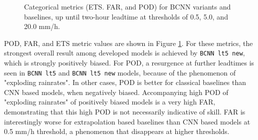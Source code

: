 \begin{figure}[H]
	\caption{Categorical metrics (ETS. FAR, and POD) for BCNN variants and baselines, up until two-hour leadtime at thresholds of 0.5, 5.0, and 20.0 mm/h.}
	\label{fig:cat-metrics}
\end{figure}

POD, FAR, and ETS metric values are shown in Figure \ref{fig:cat-metrics}. For these metrics, the strongest overall result among developed models is achieved by \texttt{BCNN lt5 new}, which is strongly positively biased. 
For POD, a resurgence at further leadtimes is seen in \texttt{BCNN lt5} and \texttt{BCNN lt5 new} models, because of the phenomenon of "exploding rainrates".  In other cases, POD is better for classical baselines than CNN based models, when negatively biased. Accompanying high POD of "exploding rainrates" of positively biased models is a very high FAR, demonstrating that this high POD is not necessarily indicative of skill. FAR is interestingly worse for extrapolation based baselines than CNN based models at 0.5 mm/h threshold, a phenomenon that disappears at higher thresholds.

